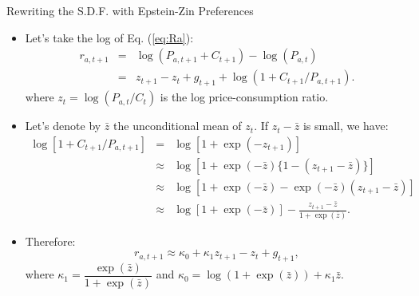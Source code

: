 \begin{frame}{Rewriting the S.D.F. with Epstein-Zin Preferences}
\begin{footnotesize}
\begin{itemize}
	\item Let's take the log of Eq. (\ref{eq:Ra}):
	\begin{eqnarray*}
	r_{a,t+1} &=& \log(P_{a,t+1}+C_{t+1}) - \log(P_{a,t})\\
	&=& z_{t+1} - z_t + g_{t+1} + \log(1 + C_{t+1} / P_{a,t+1}).
	\end{eqnarray*}
	where $z_t = \log(P_{a,t}/C_t)$ is the {\color{blue}log price-consumption ratio}.
	\item Let's denote by $\bar{z}$ the unconditional mean of $z_t$. If $z_t - \bar{z}$ is small, we have:
	\begin{eqnarray*}
	\log[1 + C_{t+1} / P_{a,t+1}] &=& \log[1 + \exp(-z_{t+1})]\\
	&\approx& \log[1 + \exp(-\bar{z})\{1 - (z_{t+1}- \bar{z})\}]\\
	&\approx& \log[1 + \exp(-\bar{z}) - \exp(-\bar{z})(z_{t+1}- \bar{z})]\\
	&\approx& \log[1 + \exp(-\bar{z})] - \frac{z_{t+1}- \bar{z}}{1 + \exp(\bar{z})}.
	\end{eqnarray*}
	\item Therefore:
	\begin{equation}\label{eq:approxRa}
	\boxed{r_{a,t+1} \approx \kappa_0 + \kappa_1 z_{t+1} - z_t + g_{t+1},}
	\end{equation}
	where $\kappa_1= \dfrac{\exp(\bar{z})}{1 + \exp(\bar{z})}$ and $\kappa_0 = \log(1 + \exp(\bar{z})) + \kappa_1 \bar{z}$.
\end{itemize}
\end{footnotesize}
\end{frame}

